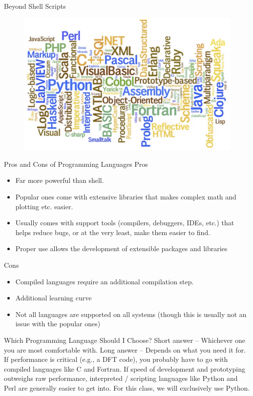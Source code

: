 \documentclass[aspectratio=169]{beamer}
\begin{document}
\begin{frame}{Beyond Shell Scripts}
\begin{figure}
    \centering
    \includegraphics[width=0.6\linewidth]{lectures/figures/9_programming_languages.png}
\end{figure} 
\end{frame}

\begin{frame}{Pros and Cons of Programming Languages}
Pros
\begin{itemize}
\item Far more powerful than shell.
\item Popular ones come with extensive libraries that makes complex math and plotting etc. easier.
\item Usually comes with support tools (compilers, debuggers, IDEs, etc.) that helps reduce bugs, or at the very least, make them easier to find.
\item Proper use allows the development of extensible packages and libraries
\end{itemize}

Cons

\begin{itemize}
 \item Compiled languages require an additional compilation step.
 \item Additional learning curve
\item Not all languages are supported on all systems (though this is usually not an issue with the popular ones)

 \end{itemize}

\end{frame} 

\begin{frame}{Which Programming Language Should I Choose?}
Short answer – Whichever one you are most comfortable with.\newline
\newline
Long answer – Depends on what you need it for.\newline
\newline
If performance is critical (e.g., a DFT code), you probably have to go with compiled languages like C and Fortran.
If speed of development and prototyping outweighs raw performance, interpreted / scripting languages like Python and Perl are generally easier to get into.\newline
\newline
For this class, we will exclusively use Python. 

\end{frame} 
\end{document}
